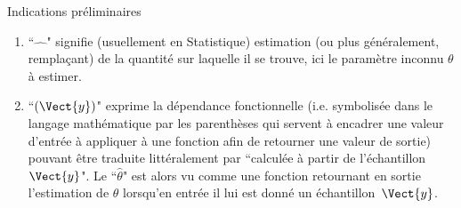 \documentclass[10pt]{report}
\begin{document}
\begin{IndicList}{Indications préliminaires}
\begin{enumerate}
\item ``$\widehat{\quad}$" signifie (usuellement en Statistique) estimation (ou plus généralement, remplaçant) de la quantité sur laquelle il se trouve, ici le paramètre inconnu $\theta$ à estimer.
\item ``$(\Vect{y})$" exprime la dépendance fonctionnelle (i.e. symbolisée dans le langage mathématique par les parenthèses qui servent à encadrer une valeur d'entrée à appliquer à une fonction afin de retourner une valeur de sortie) pouvant être traduite littéralement par ``calculée à partir de l'échantillon $\Vect{y}$". Le ``$\widehat{\theta}$" est alors vu comme une fonction retournant  en sortie l'estimation de $\theta$ lorsqu'en entrée il lui est donné un échantillon~$\Vect{y}$.
\end{enumerate}
\end{IndicList}
\end{document}
